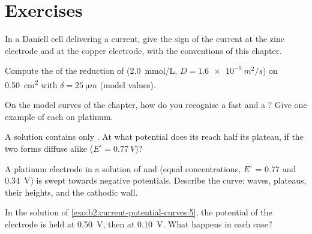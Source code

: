\section{Exercises}

\begin{exercise}[$\star$]\label{exo:b2:current-potential-curves:1}
In a Daniell cell delivering a current, give the sign of the current at the
zinc electrode and at the copper electrode, with the conventions of this
chapter.
\end{exercise}

\begin{exercise}[$\star$]\label{exo:b2:current-potential-curves:2}
Compute the  of the reduction of  (\qty{2.0}{mmol/L}, $D =
\qty{1.6e-9}{m^2/s}$) on \qty{0.50}{cm^2} with $\delta = \qty{25}{\micro m}$
(model values).
\end{exercise}

\begin{exercise}[$\star$]\label{exo:b2:current-potential-curves:3}
On the model curves of the chapter, how do you recognise a fast and a ? Give one example of each on platinum.
\end{exercise}

\begin{exercise}[$\star$]\label{exo:b2:current-potential-curves:4}
A solution contains only . At what potential does its 
reach half its plateau, if the two forms diffuse alike ($E^\circ = \qty{0.77}{V}$)?
\end{exercise}

\begin{exercise}[$\star\star$]\label{exo:b2:current-potential-curves:5}
A platinum electrode in a solution of  and  (equal
concentrations, $E^\circ$ = 0.77 and \qty{0.34}{V}) is swept towards negative
potentials. Describe the curve: waves, plateaus, their heights, and the
cathodic wall.
\end{exercise}

\begin{exercise}[$\star\star$]\label{exo:b2:current-potential-curves:6}
In the solution of \cref{exo:b2:current-potential-curves:5}, the potential of
the electrode is held at \qty{0.50}{V}, then at \qty{0.10}{V}. What happens in
each case?
\end{exercise}

